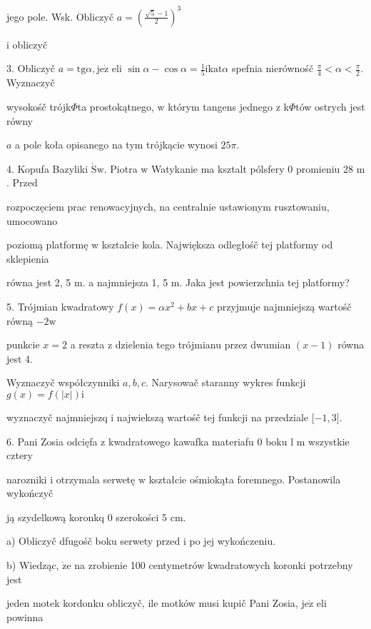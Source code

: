 \documentclass[a4paper,12pt]{article}
\begin{document}
jego pole. Wsk. Obliczyč $a=(\displaystyle \frac{\sqrt{5}-1}{2})^{3}$

i obliczyč

3. Obliczyč $a=\mathrm{t}\mathrm{g}\alpha, \mathrm{j}\mathrm{e}\dot{\mathrm{z}}$ eli $\displaystyle \sin\alpha-\cos\alpha=\frac{1}{5}\mathrm{i}\mathrm{k}\mathrm{a}\mathrm{t}\alpha$ spefnia nierównośč $\displaystyle \frac{\pi}{4}<\alpha<\frac{\pi}{2}$. Wyznaczyč

wysokośč trójk$\Phi$ta prostokątnego, $\mathrm{w}$ którym tangens jednego $\mathrm{z}$ k$\Phi$tów ostrych jest równy

$a$ a pole koła opisanego na tym trójkącie wynosi $25\pi.$

4. Kopufa Bazyliki $\acute{\mathrm{S}}\mathrm{w}$. Piotra $\mathrm{w}$ Watykanie ma ksztalt pólsfery $0$ promieniu 28 $\mathrm{m}$. Przed

rozpoczęciem prac renowacyjnych, na centralnie ustawionym rusztowaniu, umocowano

poziomą platformę $\mathrm{w}$ ksztalcie kola. Największa odległośč tej platformy od sklepienia

równa jest 2, 5 $\mathrm{m}$. a najmniejsza 1, 5 $\mathrm{m}$. Jaka jest powierzchnia tej platformy?

5. Trójmian kwadratowy $f(x)=\alpha x^{2}+bx+c$ przyjmuje najmniejszą wartośč równą $-2\mathrm{w}$

punkcie $x=2$ a reszta $\mathrm{z}$ dzielenia tego trójmianu przez dwumian $(x-1)$ równa jest 4.

Wyznaczyč współczynniki $a, b, c$. Narysowač staranny wykres funkcji $g(x) = f(|x|) \mathrm{i}$

wyznaczyč najmniejszq $\mathrm{i}$ najwiekszą wartośč tej funkcji na przedziale [$-1,3].$

6. Pani Zosia odcięfa $\mathrm{z}$ kwadratowego kawafka materiafu $0$ boku l $\mathrm{m}$ wszystkie cztery

narozniki $\mathrm{i}$ otrzymala serwetę $\mathrm{w}$ kształcie ośmiokąta foremnego. Postanowila wykończyč

ją szydelkową koronkq $0$ szerokości 5 cm.

a) Obliczyč dfugośč boku serwety przed $\mathrm{i}$ po jej wykończeniu.

b) Wiedząc, $\dot{\mathrm{z}}\mathrm{e}$ na zrobienie 100 centymetrów kwadratowych koronki potrzebny jest

jeden motek kordonku obliczyč, ile motków musi kupič Pani Zosia, $\mathrm{j}\mathrm{e}\dot{\mathrm{z}}$ eli powinna
\end{document}

